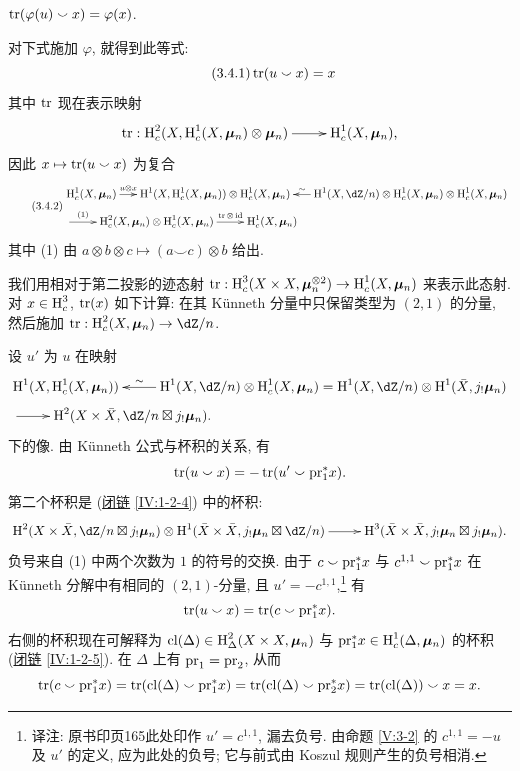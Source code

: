 \begin{proposition_}\label{V:3-4}
$\operatorname{tr}(\varphi(u)\smallsmile x) = \varphi(x)$.
\end{proposition_}

对下式施加 $\varphi$, 就得到此等式:
\begin{equation*}\tag{3.4.1}\label{V:eq:3-4-1}
  \operatorname{tr}(u\smallsmile x) = x
\end{equation*}
其中 $\operatorname{tr}$ 现在表示映射
\[\xymatrix{
  \tr:\h_c^2(X,\h_c^1(X,\dmu_n)\otimes\dmu_n) \ar[r]
    & \h_c^1(X,\dmu_n) \text{,}
}\]
因此 $x\mapsto \operatorname{tr}(u\smallsmile x)$ 为复合
\small
\begin{equation*}\tag{3.4.2}\label{V:eq:3-4-2}
\begin{aligned}
&\xymatrix@C=1.5em{
  \h_c^1(X,\dmu_n) \ar[r]^-{u\otimes x}
    & \h^1(X,\h_c^1(X,\dmu_n)) \otimes \h_c^1(X,\dmu_n)
    & \ar[l]_-\sim \h^1(X,\dZ/n)\otimes \h_c^1(X,\dmu_n) \otimes \h_c^1(X,\dmu_n)} \\ &\xymatrix{
    \ar[r]^-{(1)}
      & \h_c^2(X,\dmu_n) \otimes \h_c^1(X,\dmu_n) \ar[r]^-{\tr\otimes\operatorname{id}}
      & \h_c^1(X,\dmu_n)
}
\end{aligned}
\end{equation*}
\normalsize
其中 (1) 由 $a\otimes b\otimes c\mapsto (a\smallsmile c)\otimes b$ 给出.

我们用相对于第二投影的迹态射
$\operatorname{tr}:\operatorname{H}_c^3(X\times X,{\bm\mu}_n^{\otimes 2}) \to \operatorname{H}_c^1(X,{\bm\mu}_n)$ 来表示此态射.
对 $x\in \operatorname{H}_c^3$, $\operatorname{tr}(x)$ 如下计算:
在其 K\"unneth 分量中只保留类型为 $(2,1)$ 的分量,
然后施加 $\tr:\h_c^2(X,\dmu_n) \to \dZ/n$.

设 $u'$ 为 $u$ 在映射
\begin{align*}
&\xymatrix{
  \h^1(X,\h_c^1(X,\dmu_n))
    & \ar[l]_-\sim \h^1(X,\dZ/n) \otimes \h_c^1(X,\dmu_n) = \h^1(X,\dZ/n)\otimes \h^1(\bar X,j_!\dmu_n)
} \\
&\xymatrix{
  \ar[r]
    & \h^2(X\times \bar X,\dZ/n\boxtimes j_!\dmu_n) \text{.}
}
\end{align*}
下的像. 由 K\"unneth 公式与杯积的关系, 有
\[
  \operatorname{tr}(u\smallsmile x) = -\operatorname{tr}(u'\smallsmile \mathrm{pr}_1^\ast x) \text{.}
\]
第二个杯积是 (\hyperref[IV]{闭链} \ref{IV:1-2-4}) 中的杯积:
\[\xymatrix{
  \h^2(X\times \bar X,\dZ/n\boxtimes j_!\dmu_n) \otimes \h^1(\bar X\times \bar X,j_!\dmu_n\boxtimes \dZ/n) \ar[r]
    & \h^3(\bar X\times \bar X,j_!\dmu_n \boxtimes j_!\dmu_n) \text{.}
}\]
负号来自 (1) 中两个次数为 $1$ 的符号的交换.
由于 $c\smallsmile\mathrm{pr}_1^\ast x$ 与 $c^{1,1}\smallsmile \mathrm{pr}_1^\ast x$
在 K\"unneth 分解中有相同的 $(2,1)$-分量, 且 $u'=-c^{1,1}$,\footnote{译注: 原书印页165此处印作 $u'=c^{1,1}$, 漏去负号. 由命题 \ref{V:3-2} 的 $c^{1,1}=-u$ 及 $u'$ 的定义, 应为此处的负号; 它与前式由 Koszul 规则产生的负号相消.} 有
\[
  \operatorname{tr}(u\smallsmile x) = \operatorname{tr}(c\smallsmile \mathrm{pr}_1^\ast x) \text{.}
\]
右侧的杯积现在可解释为
$\operatorname{cl}(\Delta)\in \operatorname{H}_\Delta^2(X\times X,{\bm\mu}_n)$
与 $\mathrm{pr}_1^\ast x\in \operatorname{H}_c^1(\Delta,{\bm\mu}_n)$ 的杯积
(\hyperref[IV]{闭链} \ref{IV:1-2-5}).
在 $\Delta$ 上有 $\mathrm{pr}_1=\mathrm{pr}_2$, 从而
\[
  \operatorname{tr}(c\smallsmile \mathrm{pr}_1^\ast x) = \operatorname{tr}(\operatorname{cl}(\Delta)\smallsmile \mathrm{pr}_1^\ast x) = \operatorname{tr}(\operatorname{cl}(\Delta)\smallsmile \mathrm{pr}_2^\ast x) = \operatorname{tr}(\operatorname{cl}(\Delta))\smallsmile x = x \text{.}
\]


